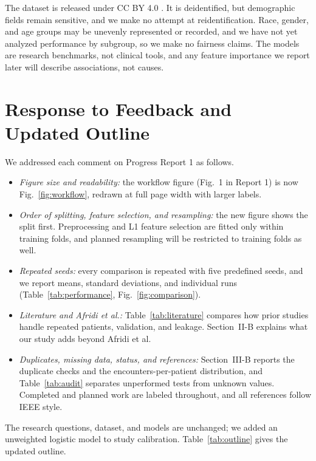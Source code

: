 \documentclass[conference]{IEEEtran}
\begin{document}
The dataset is released under CC BY 4.0 \cite{uci}. It is deidentified, but demographic fields remain sensitive, and we make no attempt at reidentification. Race, gender, and age groups may be unevenly represented or recorded, and we have not yet analyzed performance by subgroup, so we make no fairness claims. The models are research benchmarks, not clinical tools, and any feature importance we report later will describe associations, not causes.

\section{Response to Feedback and Updated Outline}
We addressed each comment on Progress Report 1 as follows.
\begin{itemize}
\item \textit{Figure size and readability:} the workflow figure (Fig.~1 in Report 1) is now Fig.~\ref{fig:workflow}, redrawn at full page width with larger labels.
\item \textit{Order of splitting, feature selection, and resampling:} the new figure shows the split first. Preprocessing and L1 feature selection are fitted only within training folds, and planned resampling will be restricted to training folds as well.
\item \textit{Repeated seeds:} every comparison is repeated with five predefined seeds, and we report means, standard deviations, and individual runs (Table~\ref{tab:performance}, Fig.~\ref{fig:comparison}).
\item \textit{Literature and Afridi et al.:} Table~\ref{tab:literature} compares how prior studies handle repeated patients, validation, and leakage. Section~II-B explains what our study adds beyond Afridi et al.
\item \textit{Duplicates, missing data, status, and references:} Section~III-B reports the duplicate checks and the encounters-per-patient distribution, and Table~\ref{tab:audit} separates unperformed tests from unknown values. Completed and planned work are labeled throughout, and all references follow IEEE style.
\end{itemize}
The research questions, dataset, and models are unchanged; we added an unweighted logistic model to study calibration. Table~\ref{tab:outline} gives the updated outline.
\end{document}
